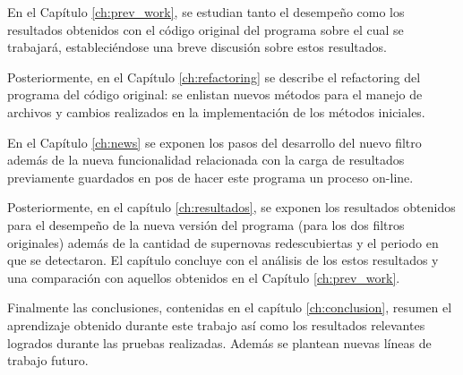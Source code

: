 En el Cap\'itulo \ref{ch:prev_work}, se estudian tanto el desempe\~no como los resultados obtenidos con el c\'odigo original del programa sobre el cual se trabajar\'a, estableci\'endose una breve discusi\'on sobre estos resultados. 
\bigskip

Posteriormente, en el Cap\'itulo \ref{ch:refactoring} se describe el refactoring del programa  del c\'odigo original: se enlistan nuevos m\'etodos para el manejo de archivos y cambios realizados en la implementaci\'on de los m\'etodos iniciales. 
\bigskip

En el Cap\'itulo \ref{ch:news} se exponen los pasos del desarrollo del nuevo filtro adem\'as de la nueva funcionalidad relacionada con la carga de resultados previamente guardados en pos de hacer este programa un proceso on-line.
\bigskip

Posteriormente, en el cap\'itulo \ref{ch:resultados}, se exponen los resultados obtenidos para el desempe\~no de la nueva versi\'on del programa (para los dos filtros originales) adem\'as de la cantidad de supernovas redescubiertas y el periodo en que se detectaron. El cap\'itulo concluye con el an\'alisis de los estos resultados y una comparaci\'on con aquellos obtenidos en el Cap\'itulo \ref{ch:prev_work}.
\bigskip

Finalmente las conclusiones, contenidas en el cap\'itulo \ref{ch:conclusion}, resumen el aprendizaje obtenido durante este trabajo as\'i como los resultados relevantes logrados durante las pruebas realizadas. Adem\'as se plantean nuevas l\'ineas de trabajo futuro.



